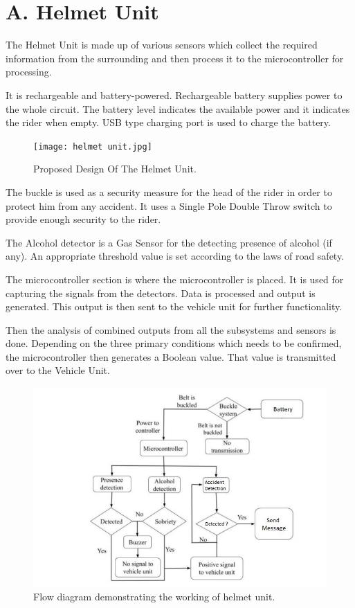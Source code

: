 \section*{A. Helmet Unit}
The Helmet Unit is made up of various sensors which collect the required information from the surrounding and then process it to the microcontroller for processing.\vspace{.3cm}

It is rechargeable and battery-powered. Rechargeable battery supplies power to the whole circuit. The battery level indicates the available power and it indicates the rider when empty. USB type charging port is used to charge the battery.

\begin{figure}[h]
	\centering
	\texttt{[image: helmet unit.jpg]}
	\captionsetup{labelformat=empty}
	\caption[]{Proposed Design Of The Helmet Unit.}
\end{figure}

The buckle is used as a security measure for the head of the rider in order to protect him from any accident. It uses a Single Pole Double Throw switch to provide enough security to the rider.\vspace{.3cm}

The Alcohol detector is a Gas Sensor for the detecting presence of alcohol (if any). An appropriate threshold value is set according to the laws of road safety.\vspace{.3cm}

The microcontroller section is where the microcontroller is placed. It is used for capturing the signals from the detectors. Data is processed and output is generated. This output is then sent to the vehicle unit for further functionality.\vspace{.3cm}

Then the analysis of combined outputs from all the subsystems and sensors is done. Depending on the three primary conditions which needs to be confirmed, the microcontroller then generates a Boolean value. That value is transmitted over to the Vehicle Unit.\vspace{.3cm}
\begin{figure}
	\centering
	\includegraphics[width=0.55\linewidth]{"images/working flow diagram"}
	\captionsetup{labelformat=empty}
	\caption[]{Flow diagram demonstrating the working of helmet unit.}
\end{figure}\vspace{.3cm}

